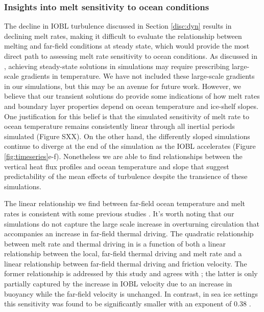 \documentclass[draft]{agujournal2019}
\begin{document}
\subsubsection{Insights into melt sensitivity to ocean conditions}

The decline in IOBL turbulence discussed in Section \ref{disc:dyn} results in declining melt rates, making it difficult to evaluate the relationship between melting and far-field conditions at steady state, which would provide the most direct path to assessing melt rate sensitivity to ocean conditions. As discussed in , achieving steady-state solutions in simulations may require prescribing large-scale gradients in temperature. We have not included these large-scale gradients in our simulations, but this may be an avenue for future work. However, we believe that our transient solutions do provide some indications of how melt rates and boundary layer properties depend on ocean temperature and ice-shelf slopes. One justification for this belief is that the simulated sensitivity of melt rate to ocean temperature remains consistently linear through all inertial periods simulated (Figure SXX). On the other hand, the differently sloped simulations continue to diverge at the end of the simulation as the IOBL accelerates (Figure \ref{fig:timeseries}e-f). Nonetheless we are able to find relationships between the vertical heat flux profiles and ocean temperature and slope that suggest predictability of the mean effects of turbulence despite the transience of these simulations.

The linear relationship we find between far-field ocean temperature and melt rates is consistent with some previous studies \cite{rignot_rapid_2002}. It's worth noting that our simulations do not capture the large scale increase in overturning circulation that accompanies an increase in far-field thermal driving. The quadratic relationship between melt rate and thermal driving in  is a function of both a linear relationship between the local, far-field thermal driving and melt rate and a linear relationship between far-field thermal driving and friction velocity. The former relationship is addressed by this study and agrees with ; the latter is only partially captured by the increase in IOBL velocity due to an increase in buoyancy while the far-field velocity is unchanged. In contrast, in sea ice settings this sensitivity was found to be significantly smaller with an exponent of 0.38 \cite{ramudu_large_2018}. 
\end{document}
